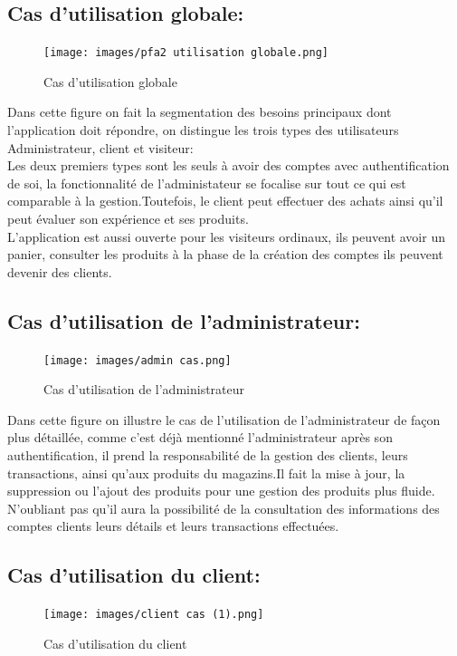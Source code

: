 \documentclass[a4paper]{report}
\begin{document}
\begin{doublespace}
\begin{doublespace}
\begin{doublespace}
\begin{doublespace}
\begin{doublespace}
\subsection{Cas d'utilisation globale:}
\begin{figure}[H]
\begin{center}
 \texttt{[image: images/pfa2 utilisation globale.png]}
 \caption{Cas d'utilisation globale}
 \end{center}
\end{figure}
\newpage
Dans cette figure on fait la segmentation des besoins principaux dont l'application doit répondre, on distingue les trois types des utilisateurs Administrateur, client et visiteur: \\Les deux premiers types sont les seuls à avoir des comptes avec authentification de soi, la fonctionnalité de l'administateur se focalise sur tout ce qui est comparable à la gestion.Toutefois, le client peut effectuer des achats ainsi qu'il peut évaluer son expérience et ses produits. \\ L'application est aussi ouverte pour les visiteurs ordinaux, ils peuvent avoir un panier, consulter les produits à la phase de la création des comptes ils peuvent devenir des clients.

\subsection{Cas d'utilisation de l'administrateur:}
\begin{figure}[H]
\begin{center}
 \texttt{[image: images/admin cas.png]}
 \caption{Cas d'utilisation de l'administrateur}
 \end{center}
\end{figure}
Dans cette figure on illustre le cas de l'utilisation de l'administrateur de façon plus détaillée, comme c'est déjà mentionné l'administrateur après son authentification, il prend la responsabilité de la gestion des clients, leurs transactions, ainsi qu'aux produits du magazins.Il fait la mise à jour, la suppression ou l'ajout des produits pour une gestion des produits plus fluide.\\ N'oubliant pas qu'il aura la possibilité de la consultation des informations des comptes clients leurs détails et leurs transactions effectuées.

\subsection{Cas d'utilisation du client:}
\begin{figure}[H]
\begin{center}
 \texttt{[image: images/client cas (1).png]}
 \caption{Cas d'utilisation du client}
 \end{center}
\end{figure}


\end{doublespace}
\end{doublespace}
\end{doublespace}
\end{doublespace}
\end{doublespace}
\end{document}
